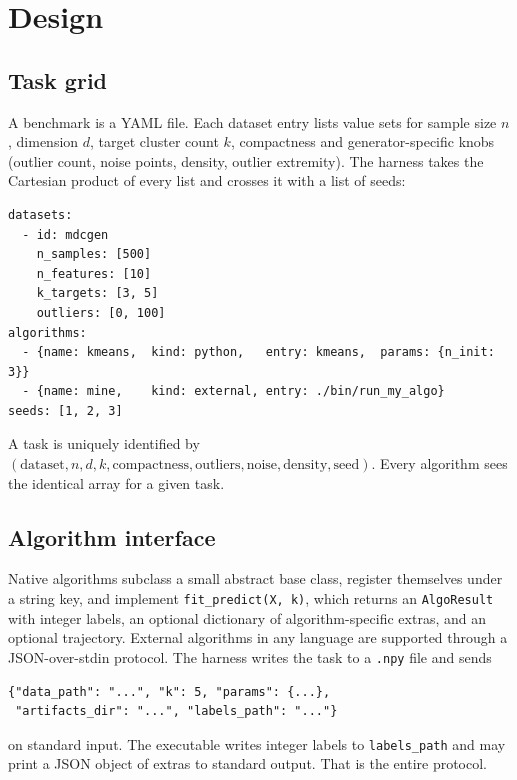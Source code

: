 \documentclass[11pt,a4paper]{article}
\newcommand{\code}[1]{\texttt{#1}}
\begin{document}
\section{Design}\label{sec:design}

\subsection{Task grid}
A benchmark is a YAML file. Each dataset entry lists value sets for sample
size $n$, dimension $d$, target cluster count $k$, compactness and
generator-specific knobs (outlier count, noise points, density, outlier
extremity). The harness takes the Cartesian product of every list and crosses
it with a list of seeds:
\begin{lstlisting}
datasets:
  - id: mdcgen
    n_samples: [500]
    n_features: [10]
    k_targets: [3, 5]
    outliers: [0, 100]
algorithms:
  - {name: kmeans,  kind: python,   entry: kmeans,  params: {n_init: 3}}
  - {name: mine,    kind: external, entry: ./bin/run_my_algo}
seeds: [1, 2, 3]
\end{lstlisting}
A task is uniquely identified by
$(\text{dataset}, n, d, k, \text{compactness}, \text{outliers}, \text{noise},
\text{density}, \text{seed})$. Every algorithm sees the identical array for a
given task.

\subsection{Algorithm interface}
Native algorithms subclass a small abstract base class, register themselves
under a string key, and implement \code{fit\_predict(X, k)}, which returns
an \code{AlgoResult} with integer labels, an optional dictionary of
algorithm-specific extras, and an optional trajectory. External algorithms in
any language are supported through a JSON-over-stdin protocol. The harness
writes the task to a \code{.npy} file and sends
\begin{lstlisting}
{"data_path": "...", "k": 5, "params": {...},
 "artifacts_dir": "...", "labels_path": "..."}
\end{lstlisting}
on standard input. The executable writes integer labels to
\code{labels\_path} and may print a JSON object of extras to standard output.
That is the entire protocol.
\end{document}
